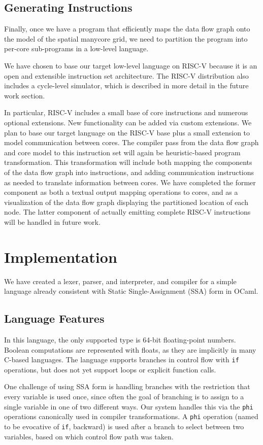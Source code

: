 \documentclass{sig-alternate-05-2015}
\begin{document}
\subsection{Generating Instructions}
Finally, once we have a program that efficiently maps the data flow graph onto the model of the spatial manycore grid, we need to partition the program into per-core sub-programs in a low-level language. 

We have chosen to base our target low-level language on RISC-V because it is an open and extensible instruction set architecture. The RISC-V distribution also includes a cycle-level simulator, which is described in more detail in the future work section. 

In particular, RISC-V includes a small base of core instructions and numerous optional extensions. New functionality can be added via custom extensions. We plan to base our target language on the RISC-V base plus a small extension to model communication between cores. The compiler pass from the data flow graph and core model to this instruction set will again be heuristic-based program transformation. This transformation will include both mapping the components of the data flow graph into instructions, and adding communication instructions as needed to translate information between cores. We have completed the former component as both a textual output mapping operations to cores, and as a visualization of the data flow graph displaying the partitioned location of each node. The latter component of actually emitting complete RISC-V instructions will be handled in future work. 

\section{Implementation}
We have created a lexer, parser, and interpreter, and compiler for a simple language already consistent with Static Single-Assignment (SSA) form in OCaml.

\subsection{Language Features}
In this language, the only supported type is 64-bit floating-point numbers. Boolean computations are represented with floats, as they are implicitly in many C-based languages. The language supports branches in control flow with \texttt{if} operations, but does not yet support loops or explicit function calls.

One challenge of using SSA form is handling branches with the restriction that every variable is used once, since often the goal of branching is to assign to a single variable in one of two different ways. Our system handles this via the \texttt{phi} operations canonically used in compiler transformations. A \texttt{phi} operation (named to be evocative of \texttt{if}, backward) is used after a branch to select between two variables, based on which control flow path was taken. 
\end{document}
